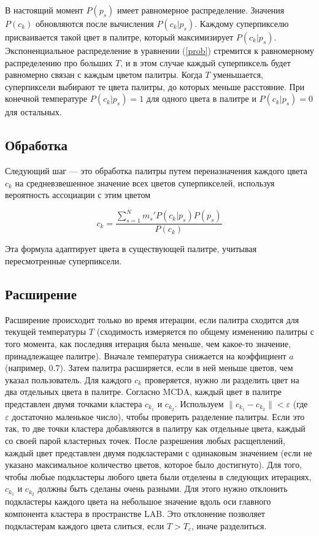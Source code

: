 \documentclass[a4paper,12pt]{report}
\begin{document}
В настоящий момент $P(p_s)$ имеет равномерное распределение. Значения $P(c_k)$ обновляются после вычисления $P(c_k|p_s)$. Каждому суперпикселю присваивается такой цвет в палитре, который максимизирует $P(c_k|p_s)$. Экспоненциальное распределение в уравнении (\ref{prob}) стремится к равномерному распределению про больших $T$, и в этом случае каждый суперпиксель будет равномерно связан с каждым цветом палитры. Когда $T$ уменьшается, суперпиксели выбирают те цвета палитры, до которых меньше расстояние. При конечной температуре $P(c_k|p_s) = 1$ для одного цвета в палитре и $P(c_k|p_s) = 0$ для остальных.

\subsection{Обработка}

Следующий шаг — это обработка палитры путем переназначения каждого цвета $c_k$ на средневзвешенное значение всех цветов суперпикселей, используя вероятность ассоциации с этим цветом

\begin{equation}
c_k = \frac{\sum_{s=1}^{N}m_s'P(c_k|p_s)P(p_s)}{P(c_k)}
\end{equation}

Эта формула адаптирует цвета в существующей палитре, учитывая пересмотренные суперпиксели. 

\subsection{Расширение}

Расширение происходит только во время итерации, если палитра сходится для текущей температуры $T$ (сходимость измеряется по общему изменению палитры с того момента, как последняя итерация была меньше, чем какое-то значение, принадлежащее палитре). Вначале температура снижается на коэффициент $a$ (например, 0.7). Затем палитра расширяется, если в ней меньше цветов, чем указал пользователь. Для каждого $c_k$ проверяется, нужно ли разделить цвет на два отдельных цвета в палитре. Согласно MCDA, каждый цвет в палитре представлен двумя точками кластера $c_k_1$ и $c_k_2$. Используем $\| c_k_1 - c_k_2 \| < \varepsilon$ (где $\varepsilon$ достаточно маленькое число), чтобы проверить разделение палитры. Если это так, то две точки кластера добавляются в палитру как отдельные цвета, каждый со своей парой кластерных точек.
После разрешения любых расщеплений, каждый цвет представлен двумя подкластерами с одинаковым значением (если не указано максимальное количество цветов, которое было достигнуто). Для того, чтобы любые подкластеры любого цвета были отделены в следующих итерациях,  $c_k_1$ и $c_k_2$ должны быть сделаны очень разными. Для этого нужно отклонить подкластеры каждого цвета на небольшое значение вдоль оси главного компонента кластера в пространстве LAB. Это отклонение позволяет подкластерам каждого цвета слиться, если $T > T_c$, иначе разделиться.
\end{document}
